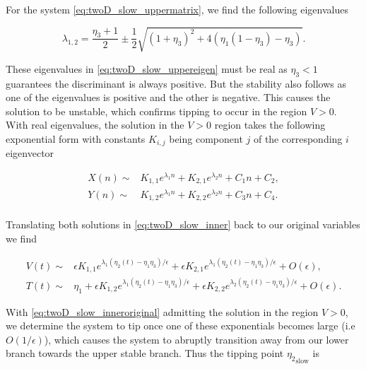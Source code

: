 For the system \eqref{eq:twoD_slow_uppermatrix}, we find the following eigenvalues

\begin{equation}\label{eq:twoD_slow_uppereigen}
\lambda_{1,2}=\frac{\eta_3+1}{2}\pm\frac{1}{2}\sqrt{(1+\eta_3)^2+4(\eta_1(1-\eta_3)-\eta_3)}.
\end{equation}

These eigenvalues in \eqref{eq:twoD_slow_uppereigen} must be real as $\eta_3<1$ guarantees the discriminant is always positive. But the stability also follows as one of the eigenvalues is positive and the other is negative. This causes the solution to be unstable, which confirms tipping to occur in the region $V>0$. With real eigenvalues, the solution in the $V>0$ region takes the following exponential form with constants $K_{i,j}$ being component $j$ of the corresponding $i$ eigenvector 

\begin{equation}\label{eq:twoD_slow_innersoln}
\begin{aligned}
X(n)\sim& K_{1,1}e^{\lambda_1 n}+K_{2,1}e^{\lambda_2 n}+C_1 n+C_2,\\
Y(n)\sim& K_{1,2}e^{\lambda_1 n}+K_{2,2}e^{\lambda_2 n}+C_3 n+C_4.\\
\end{aligned}
\end{equation}

Translating both solutions in \eqref{eq:twoD_slow_inner} back to our original variables we find

\begin{equation}\label{eq:twoD_slow_inneroriginal}
\begin{aligned}
V(t)\sim& \epsilon K_{1,1}e^{\lambda_1(\eta_2(t)-\eta_1\eta_3)/\epsilon}+\epsilon K_{2,1}e^{\lambda_1(\eta_2(t)-\eta_1\eta_3)/\epsilon}+O(\epsilon),\\
T(t)\sim& \eta_1+ \epsilon K_{1,2}e^{\lambda_1 (\eta_2(t)-\eta_1\eta_3)/\epsilon}+\epsilon K_{2,2}e^{\lambda_2 (\eta_2(t)-\eta_1\eta_3)/\epsilon}+O(\epsilon).
\end{aligned}
\end{equation}

With \eqref{eq:twoD_slow_inneroriginal} admitting the solution in the region $V>0$, we determine the system to tip once one of these exponentials becomes large (i.e $O(1/\epsilon)$), which causes the system to abruptly transition away from our lower branch towards the upper stable branch. Thus the tipping point ${\eta_2}_{\text{slow}}$ is

